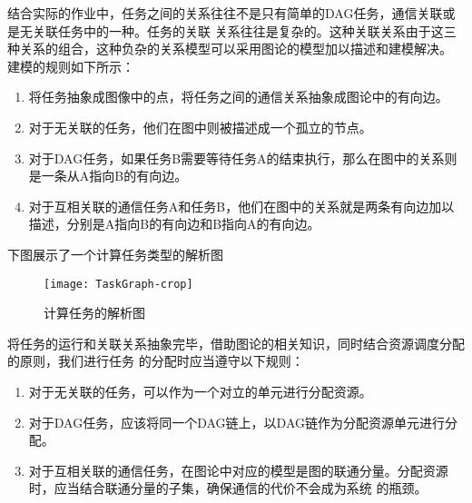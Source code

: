 结合实际的作业中，任务之间的关系往往不是只有简单的DAG任务，通信关联或是无关联任务中的一种。任务的关联
关系往往是复杂的。这种关联关系由于这三种关系的组合，这种负杂的关系模型可以采用图论的模型加以描述和建模解决。
建模的规则如下所示：
\begin{enumerate}
\item 将任务抽象成图像中的点，将任务之间的通信关系抽象成图论中的有向边。
\item 对于无关联的任务，他们在图中则被描述成一个孤立的节点。
\item 对于DAG任务，如果任务B需要等待任务A的结束执行，那么在图中的关系则是一条从A指向B的有向边。
\item 对于互相关联的通信任务A和任务B，他们在图中的关系就是两条有向边加以描述，分别是A指向B的有向边和B指向A的有向边。
\end{enumerate}
下图展示了一个计算任务类型的解析图
\begin{figure}[htbp]
\centering\texttt{[image: TaskGraph-crop]}
\caption{计算任务的解析图}\label{fig:CBTaskGraph}
\end{figure}
将任务的运行和关联关系抽象完毕，借助图论的相关知识，同时结合资源调度分配的原则，我们进行任务
的分配时应当遵守以下规则：
\begin{enumerate}
\item 对于无关联的任务，可以作为一个对立的单元进行分配资源。
\item 对于DAG任务，应该将同一个DAG链上，以DAG链作为分配资源单元进行分配。
\item 对于互相关联的通信任务，在图论中对应的模型是图的联通分量。分配资源时，应当结合联通分量的子集，确保通信的代价不会成为系统
的瓶颈。
\end{enumerate}

